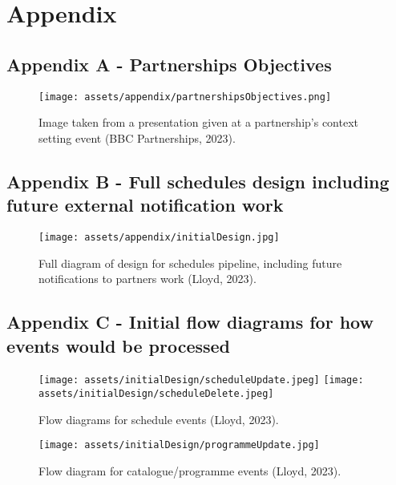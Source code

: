 \section{Appendix}

  \subsection{Appendix A - Partnerships Objectives}
    \label{sec:AppendixA}
    \begin{figure}[H]
      \centering
      \texttt{[image: assets/appendix/partnershipsObjectives.png]}
      \caption{Image taken from a presentation given at a partnership's context setting event (BBC Partnerships, 2023).}
      \label{fig:partnershipsObjectives}
    \end{figure}

  \newpage
  \subsection{Appendix B - Full schedules design including future external notification work}
    \label{sec:AppendixB}
    \begin{figure}[H]
      \centering
      \texttt{[image: assets/appendix/initialDesign.jpg]}
      \caption{Full diagram of design for schedules pipeline, including future notifications to partners work (Lloyd, 2023).}
      \label{fig:fullSpikeDesign}
    \end{figure}


  \newpage
  \subsection{Appendix C - Initial flow diagrams for how events would be processed}
    \label{sec:AppendixC}
    \begin{figure}[H]
      \centering
      \texttt{[image: assets/initialDesign/scheduleUpdate.jpeg]}
      \texttt{[image: assets/initialDesign/scheduleDelete.jpeg]}
      \caption{Flow diagrams for schedule events (Lloyd, 2023).}
      \label{fig:initialDesignSchedules}
    \end{figure}


    \begin{figure}[H]
      \centering
      \texttt{[image: assets/initialDesign/programmeUpdate.jpg]}
      \caption{Flow diagram for catalogue/programme events (Lloyd, 2023).}
      \label{fig:initialDesignProgrammes}
    \end{figure}

